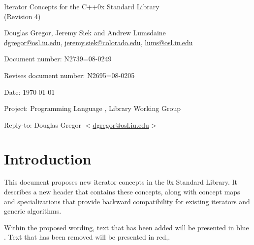 \documentclass[american,twoside]{book}
\begin{document}
\raggedbottom

\begin{titlepage}
\begin{center}
\huge
Iterator Concepts for the C++0x Standard Library\\
(Revision 4)
\vspace{0.5in}

\normalsize
Douglas Gregor, Jeremy Siek and Andrew Lumsdaine \\
\href{mailto:dgregor@osl.iu.edu}{dgregor@osl.iu.edu}, \href{mailto:jeremy.siek@colorado.edu}{jeremy.siek@colorado.edu}, \href{mailto:lums@osl.iu.edu}{lums@osl.iu.edu}
\end{center}

\vspace{1in}
\par\noindent Document number: N2739=08-0249 \vspace{-6pt}
\par\noindent Revises document number: N2695=08-0205 \vspace{-6pt}
\par\noindent Date: \today\vspace{-6pt}
\par\noindent Project: Programming Language \Cpp{}, Library Working Group\vspace{-6pt}
\par\noindent Reply-to: Douglas Gregor $<$\href{mailto:dgregor@osl.iu.edu}{dgregor@osl.iu.edu}$>$\vspace{-6pt}

\section*{Introduction}
This document proposes new iterator concepts in the \Cpp0x Standard
Library. It describes a new header  that
contains these concepts, along with concept maps and
 specializations that provide backward
compatibility for existing iterators and generic algorithms.

Within the proposed wording, text that has been added
\textcolor{addclr}{will be presented in blue} . Text that has been removed will be
presented \textcolor{remclr}{in red},. 



\end{titlepage}
\end{document}
